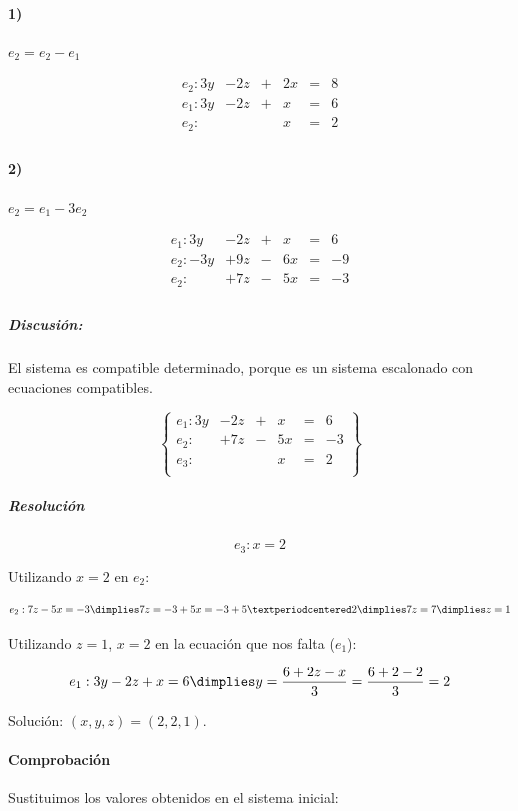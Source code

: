 \documentclass[palatino,nosec]{Docencia}
\begin{document}
\begin{problem}
\paragraph{1)}
$e_2 = e_2-e_1$

\[
\begin{array}{rccccc}
e_2: 3y&-2z&+&2x&=&8\\
e_1: 3y&-2z&+&x&=&6\\
\hline
e_2: &&&x&=&2\\
\end{array}
\]	


\paragraph{2)} $e_2 = e_1-3e_2$

\[
\begin{array}{rccccc}
e_1: 3y&-2z&+&x&=&6\\
e_2: -3y&+9z&-&6x&=&-9\\
\hline
e_2: &+7z&-&5x&=&-3\\
\end{array}
\]	



\subparagraph{Discusión:} El sistema es compatible determinado, porque es un sistema escalonado con ecuaciones compatibles.

\[
\left\{\begin{array}{lccccc}
e_1: 3y&-2z&+&x&=&6\\
e_2: &+7z&-&5x&=&-3\\
e_3: &&&x&=&2\\
\end{array}\right\}
\]


\subparagraph{Resolución} 

\[e_3: x=2\]

Utilizando $x=2$ en $e_2$:

\[e_2: 7z-5x = -3 \dimplies 7z = -3+5x = -3+5·2 \dimplies 7z=7 \dimplies z=1\]

Utilizando $z=1$, $x=2$ en la ecuación que nos falta ($e_1$):

\[
e_1: 3y-2z+x=6 \dimplies y=\frac{6+2z-x}{3} = \frac{6+2-2}{3} = 2
\]


Solución: $(x,y,z) = (2,2,1)$.

\paragraph{Comprobación}

Sustituimos los valores obtenidos en el sistema inicial:



\end{problem}
\end{document}
